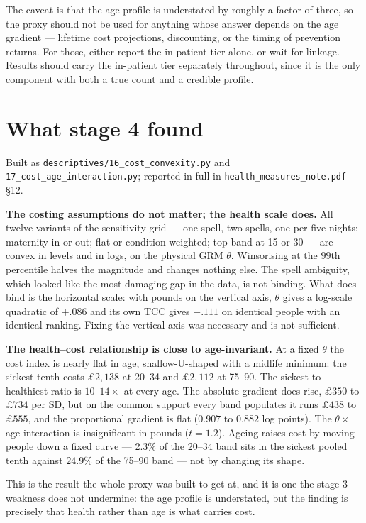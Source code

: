 \documentclass[11pt]{article}
\newcommand{\code}[1]{\texttt{\small #1}}
\begin{document}
The caveat is that the age profile is understated by roughly a factor of
three, so the proxy should not be used for anything whose answer depends on
the age gradient --- lifetime cost projections, discounting, or the timing of
prevention returns. For those, either report the in-patient tier alone, or
wait for linkage. Results should carry the in-patient tier separately
throughout, since it is the only component with both a true count and a
credible profile.

\section{What stage 4 found}

Built as \code{descriptives/16\_cost\_convexity.py} and
\code{17\_cost\_age\_interaction.py}; reported in full in
\code{health\_measures\_note.pdf} \S12.

\textbf{The costing assumptions do not matter; the health scale does.} All
twelve variants of the sensitivity grid --- one spell, two spells, one per
five nights; maternity in or out; flat or condition-weighted; top band at 15
or 30 --- are convex in levels and in logs, on the physical GRM $\theta$.
Winsorising at the 99th percentile halves the magnitude and changes nothing
else. The spell ambiguity, which looked like the most damaging gap in the
data, is not binding. What does bind is the horizontal scale: with pounds on
the vertical axis, $\theta$ gives a log-scale quadratic of $+.086$ and its own
TCC gives $-.111$ on identical people with an identical ranking. Fixing the
vertical axis was necessary and is not sufficient.

\textbf{The health--cost relationship is close to age-invariant.} At a fixed
$\theta$ the cost index is nearly flat in age, shallow-U-shaped with a midlife
minimum: the sickest tenth costs $\pounds2{,}138$ at 20--34 and
$\pounds2{,}112$ at 75--90. The sickest-to-healthiest ratio is $10$--$14\times$
at every age. The absolute gradient does rise, $\pounds350$ to $\pounds734$
per SD, but on the common support every band populates it runs $\pounds438$ to
$\pounds555$, and the proportional gradient is flat ($0.907$ to $0.882$ log
points). The $\theta \times$ age interaction is insignificant in pounds
($t = 1.2$). Ageing raises cost by moving people down a fixed curve --- $2.3\%$
of the 20--34 band sits in the sickest pooled tenth against $24.9\%$ of the
75--90 band --- not by changing its shape.

This is the result the whole proxy was built to get at, and it is one the
stage 3 weakness does not undermine: the age profile is understated, but the
finding is precisely that health rather than age is what carries cost.
\end{document}
